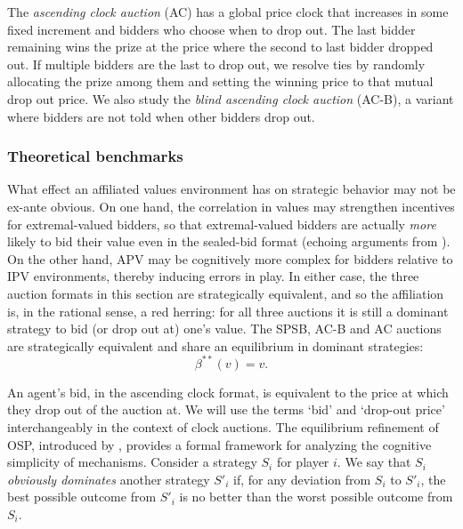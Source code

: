 \documentclass{article} %
\begin{document}
The {\em ascending clock auction} (AC) has
a global price clock that increases in some fixed increment and bidders who choose when to drop out. The last bidder remaining wins the prize at the price where the second to last bidder dropped out. If multiple bidders are the last to drop out, we resolve ties by randomly allocating the prize among them and setting the winning price to that mutual drop out price. We also study the {\em blind ascending clock auction} (AC-B), a variant 
where bidders are not told when  other bidders   drop out.

\subsubsection{Theoretical benchmarks}
What effect an affiliated values environment has on strategic behavior may not be ex-ante obvious. On one hand, the correlation in values may strengthen incentives for extremal-valued bidders, so that extremal-valued bidders are actually \textit{more} likely to bid their value even in the sealed-bid format (echoing arguments from \citet{li2017obviously}). On the other hand, APV may be cognitively more complex for bidders relative to IPV environments, thereby inducing errors in play. In either case, the three auction formats in this section are strategically equivalent, and so the affiliation is, in the rational sense, a red herring: for all three auctions it is still a dominant strategy to bid (or drop out at) one's value. The SPSB, AC-B and AC auctions are strategically equivalent and share an equilibrium in dominant strategies:
\[{\beta}^{**}(v) = v.\]

An agent's bid, in the ascending clock format, is equivalent to the price at which they drop out of the auction at. We will use the terms `bid' and `drop-out price' interchangeably in the context of clock auctions.
The equilibrium refinement of OSP, introduced by \citet{li2017obviously}, provides a formal framework for analyzing the cognitive simplicity of mechanisms.
Consider a strategy $S_i$ for player $i$. 
We say that $S_i$ {\em obviously dominates} another strategy $S'_i$ if, for any deviation from $S_i$ to $S'_i$, the best possible outcome from $S'_i$ is no better than the worst possible outcome from $S_i$.
\end{document}
